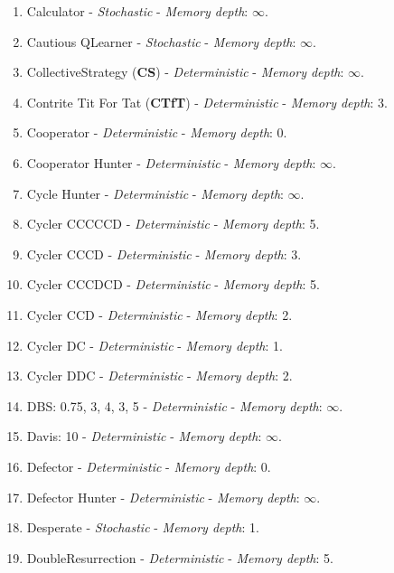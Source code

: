 \documentclass[10pt,letterpaper]{article}
\begin{document}
\begin{enumerate}
\item Calculator - \textit{Stochastic} - \textit{Memory depth}: \(\infty\). \cite{Prison1998}
\item Cautious QLearner - \textit{Stochastic} - \textit{Memory depth}: \(\infty\). \cite{axelrodproject}
\item CollectiveStrategy (\textbf{CS}) - \textit{Deterministic} - \textit{Memory depth}: \(\infty\). \cite{Li2009}
\item Contrite Tit For Tat (\textbf{CTfT}) - \textit{Deterministic} - \textit{Memory depth}: 3. \cite{Axelrod1995}
\item Cooperator - \textit{Deterministic} - \textit{Memory depth}: 0. \cite{Axelrod1984, Mittal2009, Press2012}
\item Cooperator Hunter - \textit{Deterministic} - \textit{Memory depth}: \(\infty\). \cite{axelrodproject}
\item Cycle Hunter - \textit{Deterministic} - \textit{Memory depth}: \(\infty\). \cite{axelrodproject}
\item Cycler CCCCCD - \textit{Deterministic} - \textit{Memory depth}: 5. \cite{axelrodproject}
\item Cycler CCCD - \textit{Deterministic} - \textit{Memory depth}: 3. \cite{axelrodproject}
\item Cycler CCCDCD - \textit{Deterministic} - \textit{Memory depth}: 5. \cite{axelrodproject}
\item Cycler CCD - \textit{Deterministic} - \textit{Memory depth}: 2. \cite{Mittal2009}
\item Cycler DC - \textit{Deterministic} - \textit{Memory depth}: 1. \cite{axelrodproject}
\item Cycler DDC - \textit{Deterministic} - \textit{Memory depth}: 2. \cite{Mittal2009}
\item DBS: 0.75, 3, 4, 3, 5 - \textit{Deterministic} - \textit{Memory depth}: \(\infty\). \cite{Au2006}
\item Davis: 10 - \textit{Deterministic} - \textit{Memory depth}: \(\infty\). \cite{Axelrod1980}
\item Defector - \textit{Deterministic} - \textit{Memory depth}: 0. \cite{Axelrod1984, Mittal2009, Press2012}
\item Defector Hunter - \textit{Deterministic} - \textit{Memory depth}: \(\infty\). \cite{axelrodproject}
\item Desperate - \textit{Stochastic} - \textit{Memory depth}: 1. \cite{Berg2015}
\item DoubleResurrection - \textit{Deterministic} - \textit{Memory depth}: 5. \cite{Eckhart2015}

\end{enumerate}
\end{document}
